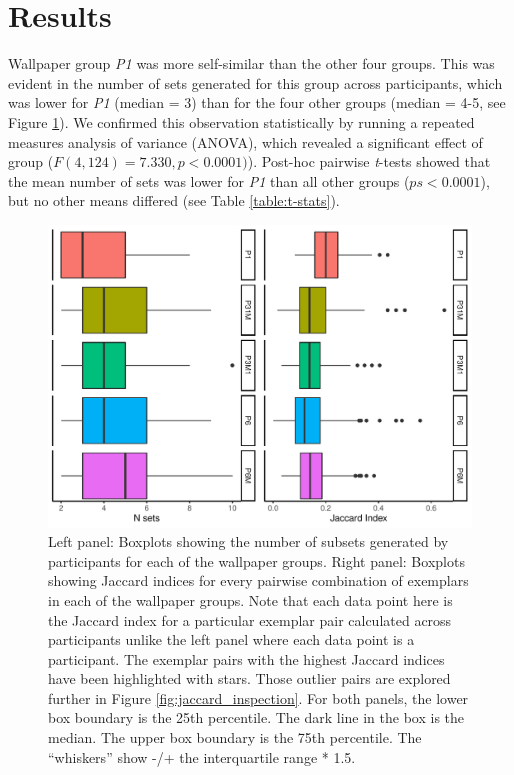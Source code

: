 \documentclass[11pt, twoside]{article}
\begin{document}
\section*{Results}
Wallpaper group \textit{P1} was more self-similar than the other four groups. This was evident in the number of sets generated for this group across participants, which was lower for \textit{P1} (median = 3) than for the four other groups (median = 4-5, see Figure \ref{fig:n_sets_jaccard_summary}). We confirmed this observation statistically by running a repeated measures analysis of variance (ANOVA), which revealed a significant effect of group ($F(4, 124) = 7.330, p < 0.0001)$). Post-hoc pairwise \textit{t}-tests showed that the mean number of sets was lower for \textit{P1} than all other groups ($ps < 0.0001$), but no other means differed (see Table \ref{table:t-stats}).
\begin{figure}[t]
	\centering
	\includegraphics[width=\linewidth]{./figures/nsets-jaccard-plot-combined-1.pdf}
	\caption{Left panel: Boxplots showing the number of subsets generated by participants for each of the wallpaper groups. Right panel: Boxplots showing Jaccard indices for every pairwise combination of exemplars in each of the wallpaper groups. Note that each data point here is the Jaccard index for a particular exemplar pair calculated across participants unlike the left panel where each data point is a participant. The exemplar pairs with the highest Jaccard indices have been highlighted with stars. Those outlier pairs are explored further in Figure \ref{fig:jaccard_inspection}. For both panels, the lower box boundary is the 25th percentile. The dark line in the box is the median. The upper box boundary is the 75th percentile. The “whiskers” show -/+ the interquartile range * 1.5. }
	\label{fig:n_sets_jaccard_summary}
\end{figure}
\end{document}
